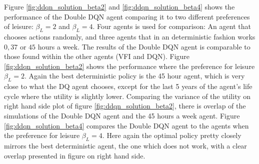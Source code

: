 Figure \ref{fig:ddqn_solution_beta2} and \ref{fig:ddqn_solution_beta4} shows the performance of the Double DQN agent comparing it to two different preferences of leisure: $\beta_L = 2$ and $\beta_L = 4$. Four agents is used for comparison: An agent that chooses actions randomly, and three agents that in an deterministic fashion works $0, 37$ or $45$ hours a week. The results of the Double DQN agent is comparable to those found within the other agents (VFI and DQN). Figure \ref{fig:ddqn_solution_beta2} shows the performance where the preference for leisure $\beta_L = 2$. Again the best deterministic policy is the 45 hour agent, which is very close to what the DQ agent chooses, except for the last 5 years of the agent's life cycle where the utility is slightly lower. Comparing the variance of the utility on right hand side plot of figure \ref{fig:ddqn_solution_beta2}, there is overlap of the simulations of the Double DQN agent and the 45 hours a week agent. Figure \ref{fig:ddqn_solution_beta4} compares the Double DQN agent to the agents when the preference for leisure $\beta_L = 4$. Here again the optimal policy pretty closely mirrors the best deterministic agent, the one which does not work, with a clear overlap presented in figure on right hand side.
